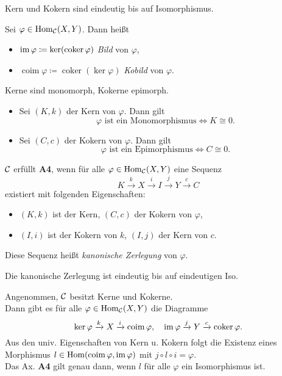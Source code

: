 \documentclass{cheat-sheet}
\DeclareMathOperator{\coker}{coker} %
\DeclareMathOperator{\coim}{coim} %
\begin{document}
\begin{bem}
  Kern und Kokern sind eindeutig bis auf Isomorphismus.
\end{bem}

\begin{defn}
  Sei $\varphi \in \operatorname{Hom}_{\mathcal{C}}(X, Y)$. Dann heißt
  \begin{itemize}
    \item $\im \varphi \coloneqq \ker(\coker \varphi)$ \emph{Bild} von $\varphi$,
    \item $\coim \varphi \coloneqq \coker(\ker \varphi)$ \emph{Kobild} von $\varphi$.
  \end{itemize}
\end{defn}

\begin{lem}
  Kerne sind monomorph, Kokerne epimorph.
\end{lem}

\begin{lem}
  \begin{itemize}
    \item Sei $(K, k)$ der Kern von $\varphi$. Dann gilt
    \[ \varphi \text{ ist ein Monomorphismus} \iff K \cong 0. \]
    \item Sei $(C, c)$ der Kokern von $\varphi$. Dann gilt
    \[ \varphi \text{ ist ein Epimorphismus} \iff C \cong 0. \]
  \end{itemize}
\end{lem}

\begin{axiom}
  $\mathcal{C}$ erfüllt \textbf{A4}, wenn für alle $\varphi \in \operatorname{Hom}_{\mathcal{C}}(X, Y)$ eine Sequenz
  \[ K \xrightarrow{k} X \xrightarrow{i} I \xrightarrow{j} Y \xrightarrow{c} C \]
  existiert mit folgenden Eigenschaften: 
  \begin{itemize}
    \item $(K, k)$ ist der Kern, $(C, c)$ der Kokern von $\varphi$,
    \item $(I, i)$ ist der Kokern von $k$, $(I, j)$ der Kern von $c$.
  \end{itemize}
  Diese Sequenz heißt \emph{kanonische Zerlegung} von $\varphi$.
\end{axiom}

\begin{bem}
  Die kanonische Zerlegung ist eindeutig bis auf eindeutigen Iso.
\end{bem}

\begin{bem}
  Angenommen, $\mathcal{C}$ besitzt Kerne und Kokerne. \\
  Dann gibt es für alle $\varphi \in \operatorname{Hom}_{\mathcal{C}}(X, Y)$ die Diagramme
  \[
    \ker \varphi \xrightarrow{k} X \xrightarrow{i} \coim \varphi, \quad
    \im \varphi \xrightarrow{j} Y \xrightarrow{c} \coker \varphi.
  \]
  Aus den univ. Eigenschaften von Kern u. Kokern folgt die Existenz eines Morphismus $l \in \Hom(\coim \varphi, \im \varphi)$ mit $j \circ l \circ i = \varphi$. \\
  Das Ax. \textbf{A4} gilt genau dann, wenn $l$ für alle $\varphi$ ein Isomorphismus ist.
\end{bem}
\end{document}
